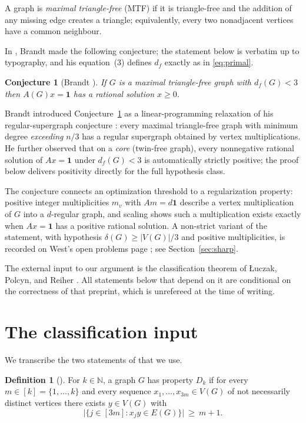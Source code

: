 \documentclass[11pt]{article}
\newtheorem{conjecture}[theorem]{Conjecture}
\theoremstyle{definition}
\newtheorem{definition}[theorem]{Definition}
\theoremstyle{remark}
\newcommand{\df}{d_f}
\newcommand{\ones}{\mathbf 1}
\begin{document}
A graph is \emph{maximal triangle-free} (MTF) if it is triangle-free and the addition of any
missing edge creates a triangle; equivalently, every two nonadjacent vertices have a common
neighbour.

In \cite[Conjecture~5.1]{Brandt2002}, Brandt made the following conjecture; the statement
below is verbatim up to typography, and his equation~(3) defines $\df$ exactly as in
\eqref{eq:primal}.

\begin{conjecture}[{Brandt \cite[Conjecture~5.1]{Brandt2002}}]\label{conj:brandt}
If $G$ is a maximal triangle-free graph with $\df(G)<3$ then $A(G)x=\ones$ has a rational
solution $x\ge0$.
\end{conjecture}

Brandt introduced Conjecture~\ref{conj:brandt} as a linear-programming relaxation of his
regular-supergraph conjecture \cite[Conjecture~4.1]{Brandt2002}: every maximal
triangle-free graph with minimum degree \emph{exceeding} $n/3$ has a regular supergraph
obtained by vertex multiplications. He further observed \cite[p.~43]{Brandt2002} that on a
\emph{core} (twin-free graph), every nonnegative rational solution of $Ax=\ones$ under
$\df(G)<3$ is automatically strictly positive; the proof below delivers positivity
directly for the full hypothesis class.

The conjecture connects an optimization threshold to a regularization property: positive
integer multiplicities $m_v$ with $Am=d\ones$ describe a vertex multiplication of $G$ into a
$d$-regular graph, and scaling shows such a multiplication exists exactly when $Ax=\ones$ has
a positive rational solution. A non-strict variant of the statement, with hypothesis
$\delta(G)\ge |V(G)|/3$ and positive multiplicities, is recorded on West's open problems
page \cite{WestPage}; see Section~\ref{sec:sharp}.

The external input to our argument is the classification theorem of \L{}uczak, Polcyn, and
Reiher \cite{LPR}. All statements below that depend on it are conditional on the correctness
of that preprint, which is unrefereed at the time of writing.

\section{The classification input}\label{sec:lpr}

We transcribe the two statements of \cite{LPR} that we use.

\begin{definition}[{\cite[Definition~1.1]{LPR}}]\label{def:dk}
For $k\in\mathbb N$, a graph $G$ has property $D_k$ if for every $m\in[k]=\{1,\dots,k\}$ and
every sequence $x_1,\dots,x_{3m}\in V(G)$ of not necessarily distinct vertices there exists
$y\in V(G)$ with
\[
\bigl|\{j\in[3m] : x_jy\in E(G)\}\bigr|\ \ge\ m+1 .
\]
\end{definition}
\end{document}
